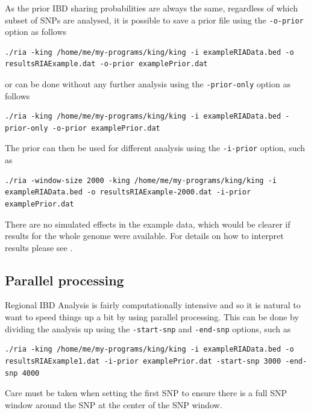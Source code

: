 \documentclass[a4paper,12pt]{article}
\newcommand{\code}[1]{{\footnotesize{{\tt #1}}}}
\begin{document}
As the prior IBD sharing probabilities are always the same, regardless of which subset of SNPs are analysed, it is possible to save a prior file using the \code{-o-prior} option as follows 
\vspace{0.35cm} \begin{lstlisting}
./ria -king /home/me/my-programs/king/king -i exampleRIAData.bed -o resultsRIAExample.dat -o-prior examplePrior.dat

\end{lstlisting} \vspace{0.35cm}
or can be done without any further analysis using the \code{-prior-only} option as follows 
\vspace{0.35cm} \begin{lstlisting}
./ria -king /home/me/my-programs/king/king -i exampleRIAData.bed -prior-only -o-prior examplePrior.dat

\end{lstlisting} \vspace{0.35cm}
The prior can then be used for different analysis using the \code{-i-prior} option, such as 
\vspace{0.35cm} \begin{lstlisting}
./ria -window-size 2000 -king /home/me/my-programs/king/king -i exampleRIAData.bed -o resultsRIAExample-2000.dat -i-prior examplePrior.dat

\end{lstlisting} \vspace{0.35cm}
There are no simulated effects in the example data, which would be clearer if results for the whole genome were available. For details on how to interpret results please see \citet{nat:15}. 
\subsection{Parallel processing}
\label{parallel}

Regional IBD Analysis is fairly computationally intensive and so it is natural to want to speed things up a bit by using parallel processing. This can be done by dividing the analysis up using the \code{-start-snp} and \code{-end-snp} options, such as 
\vspace{0.35cm} \begin{lstlisting}
./ria -king /home/me/my-programs/king/king -i exampleRIAData.bed -o resultsRIAExample1.dat -i-prior examplePrior.dat -start-snp 3000 -end-snp 4000

\end{lstlisting} \vspace{0.35cm}
Care must be taken when setting the first SNP to ensure there is a full SNP window around the SNP at the center of the SNP window. 
\end{document}

